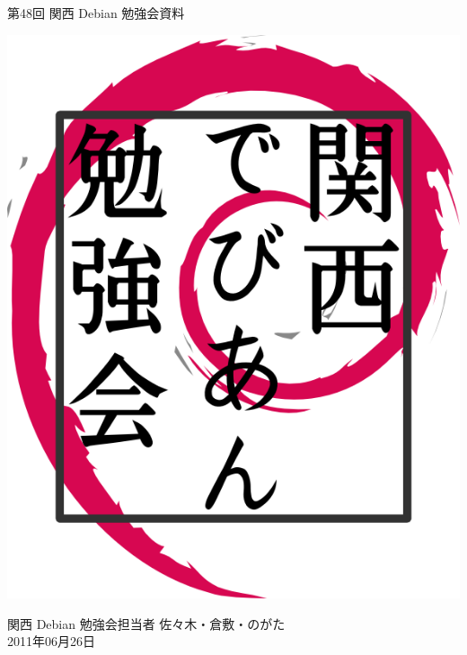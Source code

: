 \documentclass[mingoth,a4paper]{jsarticle}
\newcommand{\debmtgyear}{2011}
\newcommand{\debmtgdate}{26}
\newcommand{\debmtgmonth}{06}
\newcommand{\debmtgnumber}{48}
\begin{document}
\begin{titlepage}


 第\debmtgnumber{}回 関西 Debian 勉強会資料

\vspace{2cm}

\begin{center}
\includegraphics{image200802/kansaidebianlogo.png}
\end{center}

\begin{flushright}
\hfill{}関西 Debian 勉強会担当者 佐々木・倉敷・のがた \\
\hfill{}\debmtgyear{}年\debmtgmonth{}月\debmtgdate{}日
\end{flushright}

\thispagestyle{empty}
\end{titlepage}


\subsection*{}%
\end{document}
